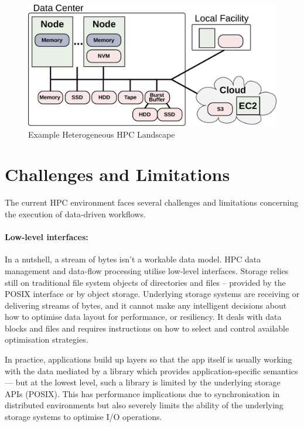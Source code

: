 \documentclass[a4paper, twocolumn]{article}
\begin{document}
\begin{figure}[b]
  \centering
  \includegraphics[width=\columnwidth]{system}
  \caption{Example Heterogeneous HPC Landscape}
  \label{fig:heterogeneous}
\end{figure}

\section{Challenges and Limitations}
\label{sec:challenges}
The current HPC environment faces several challenges and limitations concerning the execution of data-driven workflows.



\paragraph{Low-level interfaces:}
In a nutshell, a stream of bytes isn't a workable data model.
HPC data management and data-flow processing utilise low-level interfaces.
Storage relies still on traditional file system objects of directories and files -- provided by the POSIX interface or by object storage.
Underlying storage systems are receiving or delivering streams of bytes, and it cannot make any intelligent decisions about how to optimise data layout for performance, or resiliency.
It deals with data blocks and files and requires instructions on how to select and control available optimisation strategies.

In practice, applications build up layers so that the app itself is usually working with the data mediated by a library which provides application-specific semantics --- but at the lowest level, such a library is limited by the underlying storage APIs (POSIX).
This has performance implications due to synchronisation in distributed environments but also severely limits the ability of the underlying storage systems to optimise I/O operations.
\end{document}
